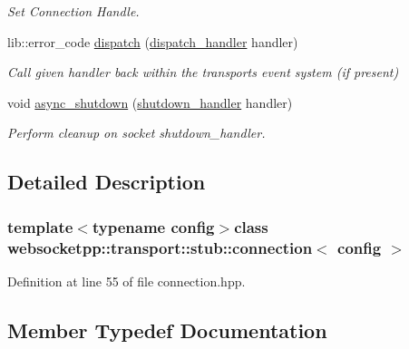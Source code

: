 \begin{DoxyCompactItemize}
\begin{DoxyCompactList}\small\item\em Set Connection Handle. \end{DoxyCompactList}\item 
lib\+::error\+\_\+code \hyperlink{classwebsocketpp_1_1transport_1_1stub_1_1connection_a8a02eae7fd9209b0c953feb931dc781c}{dispatch} (\hyperlink{namespacewebsocketpp_1_1transport_a6658447b2e10f4c712dd792aad0e0c78}{dispatch\+\_\+handler} handler)
\begin{DoxyCompactList}\small\item\em Call given handler back within the transport\textquotesingle{}s event system (if present) \end{DoxyCompactList}\item 
void \hyperlink{classwebsocketpp_1_1transport_1_1stub_1_1connection_ac6a43b32fd72e5d51e175f9431d314da}{async\+\_\+shutdown} (\hyperlink{namespacewebsocketpp_1_1transport_af39aff6fc4cb76f7df0d5322b734d156}{shutdown\+\_\+handler} handler)
\begin{DoxyCompactList}\small\item\em Perform cleanup on socket shutdown\+\_\+handler. \end{DoxyCompactList}\end{DoxyCompactItemize}


\subsection{Detailed Description}
\subsubsection*{template$<$typename config$>$class websocketpp\+::transport\+::stub\+::connection$<$ config $>$}



Definition at line 55 of file connection.\+hpp.



\subsection{Member Typedef Documentation}
\hypertarget{classwebsocketpp_1_1transport_1_1stub_1_1connection_ab3b726566d87b32c0ea2fac987a12881}{}
